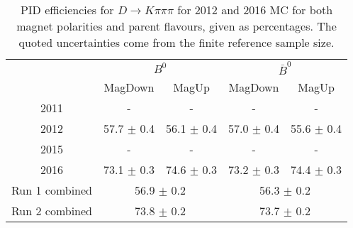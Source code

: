 \begin{table}[H]
    \centering
    \begin{tabular}{ccccc}
        \toprule
        & \multicolumn{2}{c}{$B^0$} &  \multicolumn{2}{c}{$\bar{B}^0$}\\
        & MagDown & MagUp & MagDown & MagUp\\
        \midrule
2011 & - & - & - & - \\
2012 & 57.7 $\pm$ 0.4 & 56.1 $\pm$ 0.4 & 57.0 $\pm$ 0.4 & 55.6 $\pm$ 0.4 \\
2015 & - & - & - & - \\
2016 & 73.1 $\pm$ 0.3 & 74.6 $\pm$ 0.3 & 73.2 $\pm$ 0.3 & 74.4 $\pm$ 0.3 \\
        \midrule
Run 1 combined & \multicolumn{2}{c}{56.9 $\pm$ 0.2} & \multicolumn{2}{c}{56.3 $\pm$ 0.2} \\
Run 2 combined & \multicolumn{2}{c}{73.8 $\pm$ 0.2} & \multicolumn{2}{c}{73.7 $\pm$ 0.2} \\
        \bottomrule
    \end{tabular}
    \caption{PID efficiencies for $D \to K\pi\pi\pi$ for 2012 and 2016 MC for both magnet polarities and parent flavours, given as percentages. The quoted  uncertainties come from the finite reference sample size.}
\label{tab:PID_efficiency_Kpipipi}
\end{table}
